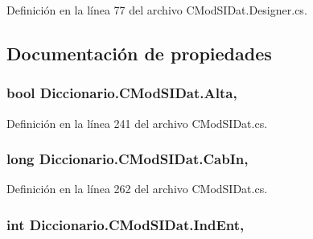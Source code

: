 Definición en la línea 77 del archivo C\-Mod\-S\-I\-Dat.\-Designer.\-cs.



\subsection{Documentación de propiedades}
\hypertarget{class_diccionario_1_1_c_mod_s_i_dat_aa70756d84d3c15e390f8ce386073da48}{
\subsubsection[{Alta}]{\setlength{\rightskip}{0pt plus 5cm}bool Diccionario.\-C\-Mod\-S\-I\-Dat.\-Alta\hspace{0.3cm}{\ttfamily [get]}, {\ttfamily [set]}}}\label{class_diccionario_1_1_c_mod_s_i_dat_aa70756d84d3c15e390f8ce386073da48}


Definición en la línea 241 del archivo C\-Mod\-S\-I\-Dat.\-cs.

\hypertarget{class_diccionario_1_1_c_mod_s_i_dat_a2e43748ede7a3934e2ded51d3a4336c4}{
\subsubsection[{Cab\-In}]{\setlength{\rightskip}{0pt plus 5cm}long Diccionario.\-C\-Mod\-S\-I\-Dat.\-Cab\-In\hspace{0.3cm}{\ttfamily [get]}, {\ttfamily [set]}}}\label{class_diccionario_1_1_c_mod_s_i_dat_a2e43748ede7a3934e2ded51d3a4336c4}


Definición en la línea 262 del archivo C\-Mod\-S\-I\-Dat.\-cs.

\hypertarget{class_diccionario_1_1_c_mod_s_i_dat_a3f74a1343a46ba6b1e5bf5a9981d4950}{
\subsubsection[{Ind\-Ent}]{\setlength{\rightskip}{0pt plus 5cm}int Diccionario.\-C\-Mod\-S\-I\-Dat.\-Ind\-Ent\hspace{0.3cm}{\ttfamily [get]}, {\ttfamily [set]}}}\label{class_diccionario_1_1_c_mod_s_i_dat_a3f74a1343a46ba6b1e5bf5a9981d4950}


